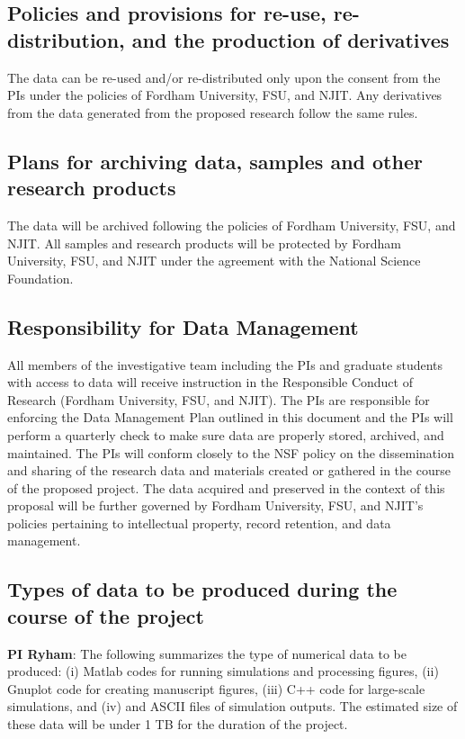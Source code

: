 \documentclass[11pt]{article}
\begin{document}
\subsection*{Policies and provisions for re-use, re-distribution, and
the production of derivatives}
The data can be re-used and/or re-distributed only upon the consent from
the PIs under the policies of Fordham University, FSU, and NJIT. Any
derivatives from the data generated from the proposed research follow
the same rules.

\subsection*{Plans for archiving data, samples and other research
products}
The data will be archived following the policies of Fordham University,
FSU, and NJIT. All samples and research products will be protected by
Fordham University, FSU, and NJIT under the agreement with the National
Science Foundation.

\subsection*{Responsibility for Data Management}
All members of the investigative team including the PIs and graduate
students with access to data will receive instruction in the Responsible
Conduct of Research (Fordham University, FSU, and NJIT). The PIs are
responsible for enforcing the Data Management Plan outlined in this
document and the PIs will perform a quarterly check to make sure data
are properly stored, archived, and maintained. The PIs will conform
closely to the NSF policy on the dissemination and sharing of the
research data and materials created or gathered in the course of the
proposed project. The data acquired and preserved in the context of
this proposal will be further governed by Fordham University, FSU, and
NJIT's policies pertaining to intellectual property, record retention,
and data
management.

\subsection*{Types of data to be produced during the course of the
project}
{\bf PI Ryham}:
The following summarizes the type of numerical data to
be produced:
(i) Matlab codes for running simulations and
processing figures,
(ii) Gnuplot code for creating manuscript figures, 
(iii) C++ code for large-scale simulations, and 
(iv) and ASCII files of simulation outputs. The estimated size of these
data will be under 1 TB for the duration of the project.  
\end{document}

